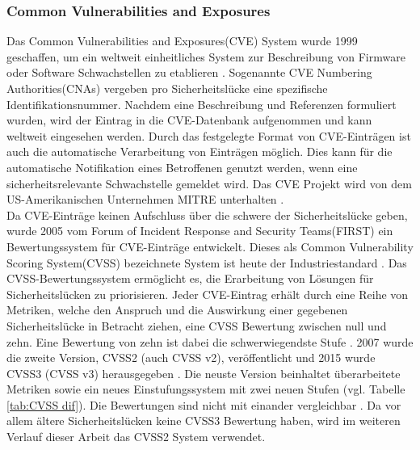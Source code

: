 \documentclass[a4paper]{book}
\begin{document}
\begin{large}
\subsubsection{Common Vulnerabilities and Exposures}
\label{CVE}
\begin{onehalfspace}
Das \glqq Common Vulnerabilities and Exposures\grqq{}(CVE) System wurde 1999 geschaffen, um ein weltweit einheitliches System zur Beschreibung von Firmware oder Software Schwachstellen zu etablieren \cite{MITRE.2020}. Sogenannte \glqq CVE Numbering Authorities\grqq{}(CNAs) vergeben pro Sicherheitslücke eine spezifische Identifikationsnummer. Nachdem eine Beschreibung und Referenzen formuliert wurden, wird der Eintrag in die CVE-Datenbank aufgenommen und kann weltweit eingesehen werden. Durch das festgelegte Format von CVE-Einträgen ist auch die automatische Verarbeitung von Einträgen möglich. Dies kann für die automatische Notifikation eines Betroffenen genutzt werden, wenn eine sicherheitsrelevante Schwachstelle gemeldet wird. Das CVE Projekt wird von dem US-Amerikanischen Unternehmen \glqq MITRE\grqq{} unterhalten \cite{Luigi.2020}.\\ \indent
Da CVE-Einträge keinen Aufschluss über die schwere der Sicherheitslücke geben, wurde 2005 vom \glqq Forum of Incident Response and Security Teams\grqq{}(FIRST) ein \mbox Bewertungssystem für CVE-Einträge entwickelt. Dieses als \glqq Common Vulnerability \mbox Scoring System\grqq{}(CVSS) bezeichnete System ist heute der Industriestandard \cite{Luigi.2020}. Das CVSS-Bewertungssystem ermöglicht es, die Erarbeitung von Lösungen für Sicherheitslücken zu priorisieren. Jeder CVE-Eintrag erhält durch eine Reihe von Metriken, welche den Anspruch und die Auswirkung einer gegebenen Sicherheitslücke in Betracht ziehen, eine CVSS Bewertung zwischen null und zehn. Eine Bewertung von zehn ist dabei die schwerwiegendste Stufe \cite{CVSS2.2007}. 2007 wurde die zweite Version, CVSS2 (auch CVSS v2), veröffentlicht und 2015 wurde CVSS3 (CVSS v3) herausgegeben \cite{CVSS2.2007, CVSS3.2015}. Die neuste Version beinhaltet überarbeitete Metriken sowie ein neues Einstufungssystem mit zwei neuen Stufen (vgl. Tabelle \ref{tab:CVSS dif}). Die Bewertungen sind nicht mit einander vergleichbar \cite{CVSS3.2015}. Da vor allem ältere Sicherheitslücken keine CVSS3 Bewertung haben, wird im weiteren Verlauf dieser Arbeit das CVSS2 System verwendet.



\end{onehalfspace}
\end{large}
\end{document}
